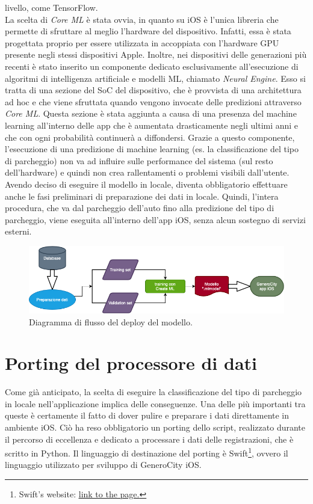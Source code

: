 livello, come TensorFlow.\\
La scelta di \emph{Core ML} è stata ovvia, in quanto su iOS è l'unica
libreria che permette di sfruttare al meglio l'hardware del dispositivo.
Infatti, essa è stata progettata proprio per essere utilizzata in
accoppiata con l'hardware GPU presente negli stessi dispositivi Apple.
Inoltre, nei dispositivi delle generazioni più recenti è stato inserito
un componente dedicato esclusivamente all'esecuzione di algoritmi di
intelligenza artificiale e modelli ML, chiamato \emph{Neural Engine}.
Esso si tratta di una sezione del SoC del dispositivo, che è provvista di una 
architettura ad hoc e che viene sfruttata quando vengono invocate delle
predizioni attraverso \emph{Core ML}. Questa sezione è stata aggiunta 
a causa di una presenza del machine learning all'interno delle app
che è aumentata drasticamente negli ultimi anni e che con ogni
probabilità continuerà a diffondersi. Grazie a questo componente,
l'esecuzione di una predizione di machine learning (es. la 
classificazione del tipo di parcheggio) non va ad influire sulle
performance del sistema (sul resto dell'hardware) e quindi non 
crea rallentamenti o problemi visibili dall'utente.\\
Avendo deciso di eseguire il modello in locale, diventa obbligatorio
effettuare anche le fasi preliminari di preparazione dei dati in 
locale. Quindi, l'intera procedura, che va dal parcheggio 
dell'auto fino alla predizione del tipo di parcheggio, viene
eseguita all'interno dell'app iOS, senza alcun sostegno di 
servizi esterni.
\begin{figure}
    \centering
    \includegraphics[width=14cm]{images/flow_diagram_deploy_modello.png}
    \caption{Diagramma di flusso del deploy del modello.}
    \label{fig:flow_diagram_deploy_modello}
\end{figure}

\section{Porting del processore di dati}

Come già anticipato, la scelta di eseguire la classificazione del tipo di
parcheggio in locale nell'applicazione implica delle conseguenze.
Una delle più importanti tra queste è certamente il fatto di dover
pulire e preparare i dati direttamente in ambiente iOS. Ciò
ha reso obbligatorio un porting dello script, realizzato durante il percorso di 
eccellenza e dedicato a processare i
dati delle registrazioni, che è scritto in Python. Il linguaggio di 
destinazione del porting è Swift\footnote{
Swift's website: 
\href{https://swift.org}{\underline{link to the page.}}}, ovvero il linguaggio utilizzato
per sviluppo di GeneroCity iOS.

